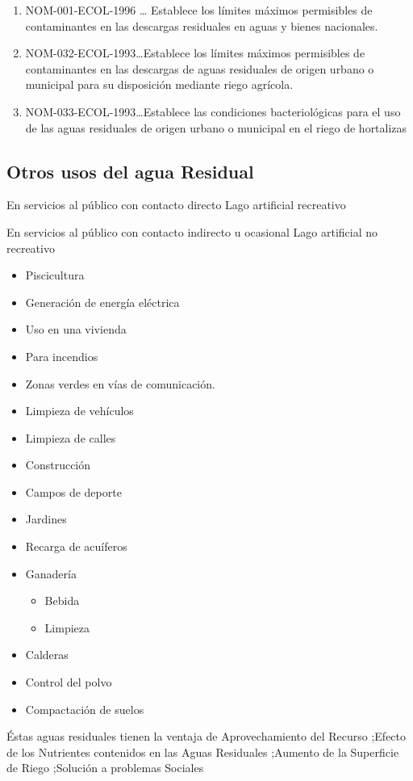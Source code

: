 \begin{enumerate}
    \item NOM-001-ECOL-1996 … Establece los límites máximos permisibles de contaminantes en las descargas residuales en aguas y bienes nacionales.
    \item NOM-032-ECOL-1993…Establece los límites máximos permisibles de contaminantes en las descargas de aguas residuales de origen urbano o municipal para su disposición mediante riego agrícola.
    \item NOM-033-ECOL-1993…Establece las condiciones bacteriológicas para el uso de las aguas residuales de origen urbano o municipal en el riego de hortalizas 
\end{enumerate}

\subsection{Otros usos del agua Residual}
En servicios al público con contacto directo
Lago artificial recreativo

En servicios al público con contacto indirecto u ocasional
Lago artificial no recreativo

\begin{itemize}
    \item Piscicultura
    \item Generación de energía eléctrica
    \item Uso en una vivienda
    \item Para incendios
    \item Zonas verdes en vías de comunicación.
    \item Limpieza de vehículos
    \item Limpieza de calles
    \item Construcción
    \item Campos de deporte
    \item Jardines
    \item Recarga de acuíferos
    \item Ganadería \begin{itemize}
        \item Bebida
        \item Limpieza
    \end{itemize}
    \item Calderas
    \item Control del polvo
    \item Compactación de suelos    
\end{itemize}
Éstas aguas residuales tienen la ventaja de Aprovechamiento del Recurso ;Efecto de los Nutrientes contenidos en las Aguas Residuales ;Aumento de la Superficie de Riego ;Solución a problemas Sociales

